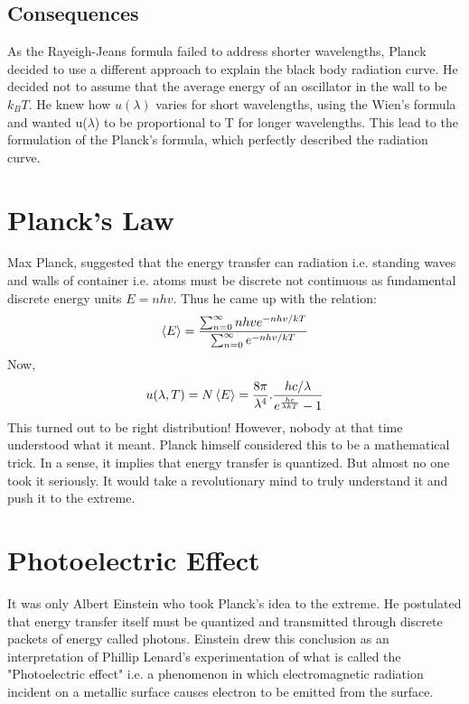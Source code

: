 \subsection{Consequences}
As the Rayeigh-Jeans formula failed to address shorter wavelengths, Planck decided to use a different approach to explain the black body radiation curve. He decided not to assume that the average energy of an oscillator in the wall to be $k_BT$. He knew how $u(\lambda)$ varies for short wavelengths, using the Wien's formula and wanted u($\lambda$) to be proportional to T for longer wavelengths. This lead to the formulation of the Planck's formula, which perfectly described the radiation curve.
\section{Planck's Law}
Max Planck, suggested that the energy transfer can radiation i.e. standing waves and walls of container
i.e. atoms must be discrete not continuous as fundamental discrete energy units $E = nhv$. Thus he came up with the relation:
\begin{equation}
\expval{E} = \frac{\sum^{\infty}_{n=0} nhve^{-nhv/kT}}{\sum^{\infty}_{n=0}e^{-nhv/kT}}
\end{equation}
Now,
\begin{equation}
u(\lambda, T) = N \expval{E} = \frac{8 \pi}{\lambda^{4}}.\frac{hc/ \lambda}{e^{\frac{hc}{\lambda k T}}-1}
\end{equation}
This turned out to be right distribution! However, nobody at that time understood what it meant. Planck himself considered this to be a mathematical trick. In a sense, it implies that energy transfer is quantized. But almost no one took it seriously. It would take a revolutionary mind to truly understand it and push it to the extreme.
\section{Photoelectric Effect}
It was only Albert Einstein who took Planck's idea to the extreme. He postulated that energy transfer itself must be quantized and transmitted through discrete packets of energy called photons. Einstein drew this conclusion as an interpretation of Phillip Lenard's experimentation of what is called the "Photoelectric effect" i.e. a phenomenon in which electromagnetic radiation incident on a metallic surface causes electron to be emitted from the surface.
